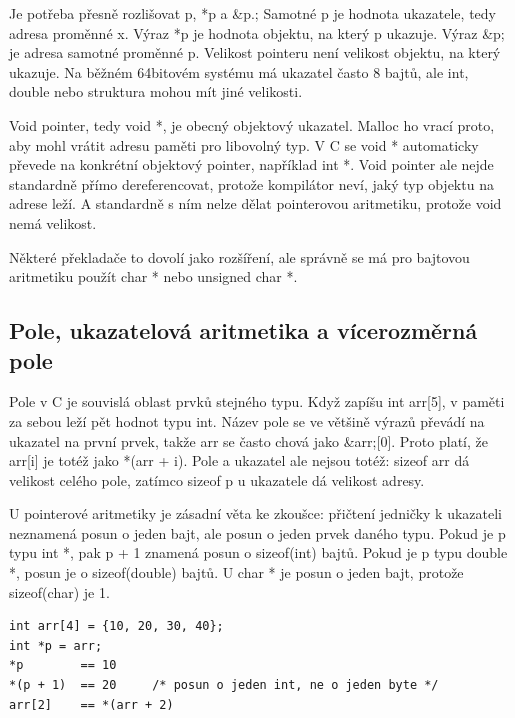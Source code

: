 
Je potřeba přesně rozlišovat p, *p a \&p.; Samotné p je hodnota ukazatele, tedy adresa proměnné x. Výraz *p je hodnota objektu, na který p ukazuje. Výraz \&p; je adresa samotné proměnné p. Velikost pointeru není velikost objektu, na který ukazuje. Na běžném 64bitovém systému má ukazatel často 8 bajtů, ale int, double nebo struktura mohou mít jiné velikosti.

Void pointer, tedy void *, je obecný objektový ukazatel. Malloc ho vrací proto, aby mohl vrátit adresu paměti pro libovolný typ. V C se void * automaticky převede na konkrétní objektový pointer, například int *. Void pointer ale nejde standardně přímo dereferencovat, protože kompilátor neví, jaký typ objektu na adrese leží. A standardně s ním nelze dělat pointerovou aritmetiku, protože void nemá velikost.

Některé překladače to dovolí jako rozšíření, ale správně se má pro bajtovou aritmetiku použít char * nebo unsigned char *.

\subsection*{Pole, ukazatelová aritmetika a vícerozměrná pole}

Pole v C je souvislá oblast prvků stejného typu. Když zapíšu int arr[5], v paměti za sebou leží pět hodnot typu int. Název pole se ve většině výrazů převádí na ukazatel na první prvek, takže arr se často chová jako \&arr;[0]. Proto platí, že arr[i] je totéž jako *(arr + i). Pole a ukazatel ale nejsou totéž: sizeof arr dá velikost celého pole, zatímco sizeof p u ukazatele dá velikost adresy.

U pointerové aritmetiky je zásadní věta ke zkoušce: přičtení jedničky k ukazateli neznamená posun o jeden bajt, ale posun o jeden prvek daného typu. Pokud je p typu int *, pak p + 1 znamená posun o sizeof(int) bajtů. Pokud je p typu double *, posun je o sizeof(double) bajtů. U char * je posun o jeden bajt, protože sizeof(char) je 1.

\begin{codebox}
\small
\begin{verbatim}
int arr[4] = {10, 20, 30, 40};
int *p = arr;
*p        == 10
*(p + 1)  == 20     /* posun o jeden int, ne o jeden byte */
arr[2]    == *(arr + 2)
\end{verbatim}
\end{codebox}

